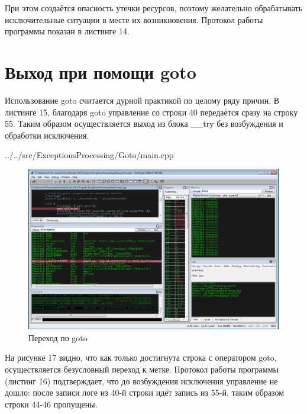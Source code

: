 \documentclass[a4paper, 12pt]{report}		%
\begin{document}
При этом создаётся опасность утечки ресурсов, поэтому желательно обрабатывать исключительные ситуации в месте их возникновения. Протокол работы программы показан в листинге 14.



\chapter*{Выход при помощи goto}

Использование goto считается дурной практикой по целому ряду причин. В листинге 15, благодаря goto управление со строки 40 передаётся сразу на строку 55. Таким образом осуществляется выход из блока \_\_try без возбуждения и обработки исключения.


{../../src/ExceptionsProcessing/Goto/main.cpp}

\begin{figure}[h!]
\centering
\includegraphics[scale=0.50]{res/010}
\caption{Переход по goto}
\end{figure}

На рисунке 17 видно, что как только достигнута строка с оператором goto, осуществляется безусловный переход к метке. Протокол работы программы (листинг 16) подтверждает, что до возбуждения исключения управление не дошло: после записи  логе из 40-й строки идёт запись из 55-й, таким образом строки 44-46 пропущены.
\newpage
\end{document}
